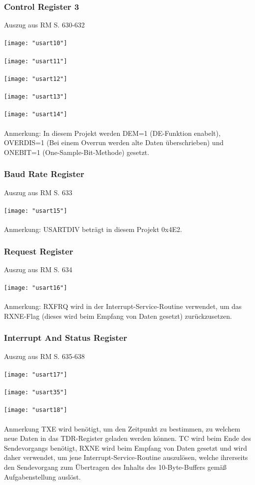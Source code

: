 \documentclass[11pt]{report}
\begin{document}
			\subsubsection{Control Register 3}
				Auszug aus RM S. 630-632\\
				\\\texttt{[image: "usart10"]}\\
				\\\texttt{[image: "usart11"]}\\
				\\\texttt{[image: "usart12"]}\\
				\\\texttt{[image: "usart13"]}\\
				\\\texttt{[image: "usart14"]}\\
				\\Anmerkung: In diesem Projekt werden DEM=1 (DE-Funktion enabelt), OVERDIS=1 (Bei einem Overrun werden alte Daten überschrieben) und ONEBIT=1 (One-Sample-Bit-Methode) gesetzt.
			\subsubsection{Baud Rate Register}
				Auszug aus RM S. 633\\
				\\\texttt{[image: "usart15"]}\\
				\\Anmerkung: USARTDIV beträgt in diesem Projekt 0x4E2.
			\subsubsection{Request Register}
				Auszug aus RM S. 634\\
				\\\texttt{[image: "usart16"]}\\
				\\Anmerkung: RXFRQ wird in der Interrupt-Service-Routine verwendet, um das RXNE-Flag (dieses wird beim Empfang von Daten gesetzt) zurückzusetzen.
			\subsubsection{Interrupt And Status Register}
				Auszug aus RM S. 635-638\\
				\\\texttt{[image: "usart17"]}\\
				\\\texttt{[image: "usart35"]}\\
				\\\texttt{[image: "usart18"]}\\
				\\Anmerkung TXE wird benötigt, um den Zeitpunkt zu bestimmen, zu welchem neue Daten in das TDR-Register geladen werden können. TC wird beim Ende des Sendevorgangs benötigt, RXNE wird beim Empfang von Daten gesetzt und wird daher verwendet, um jene Interrupt-Service-Routine auszulösen, welche ihrerseits den Sendevorgang zum Übertragen des Inhalts des 10-Byte-Buffers gemäß Aufgabenstellung auslöst.
\end{document}
